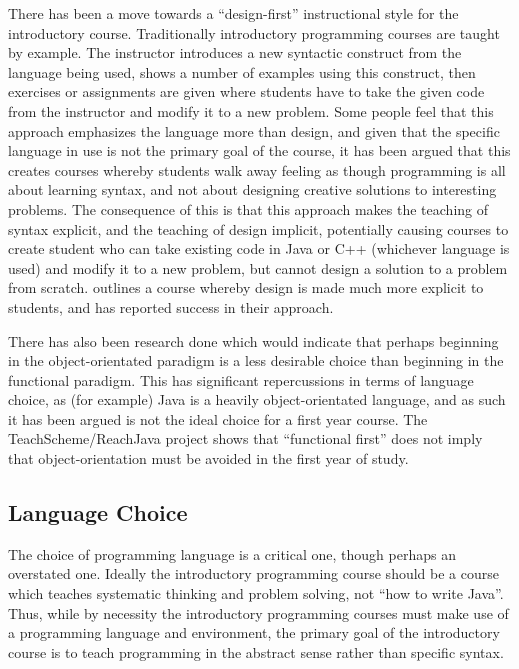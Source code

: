There has been a move towards a ``design-first'' instructional style for the introductory course.  Traditionally introductory programming courses are taught by example.  The instructor introduces a new syntactic construct from the language being used, shows a number of examples using this construct, then exercises or assignments are given where students have to take the given code from the instructor and modify it to a new problem.  Some people feel that this approach emphasizes the language more than design, and given that the specific language in use is not the primary goal of the course, it has been argued that this creates courses whereby students walk away feeling as though programming is all about learning syntax, and not about designing creative solutions to interesting problems.  The consequence of this is that this approach makes the teaching of syntax explicit, and the teaching of design implicit, potentially causing courses to create student who can take existing code in Java or C++ (whichever language is used) and modify it to a new problem, but cannot design a solution to a problem from scratch.  \cite{Flatt04} outlines a course whereby design is made much more explicit to students, and has reported success in their approach.

There has also been research done which would indicate that perhaps beginning in the object-orientated paradigm is a less desirable choice than beginning in the functional paradigm\cite{Flatt04,Huch05}.  This has significant repercussions in terms of language choice, as (for example) Java is a heavily object-orientated language, and as such it has been argued is not the ideal choice for a first year course\cite{Bos98,Huch05}.  The TeachScheme/ReachJava project shows that ``functional first'' does not imply that object-orientation must be avoided in the first year of study\cite{Bloch08,teachScheme,Felleisen04}.


\subsection{Language Choice}

The choice of programming language is a critical one, though perhaps an overstated one.  Ideally the introductory programming course should be a course which teaches systematic thinking and problem solving, not ``how to write Java''.  Thus, while by necessity the introductory programming courses must make use of a programming language and environment, the primary goal of the introductory course is to teach programming in the abstract sense rather than specific syntax.

